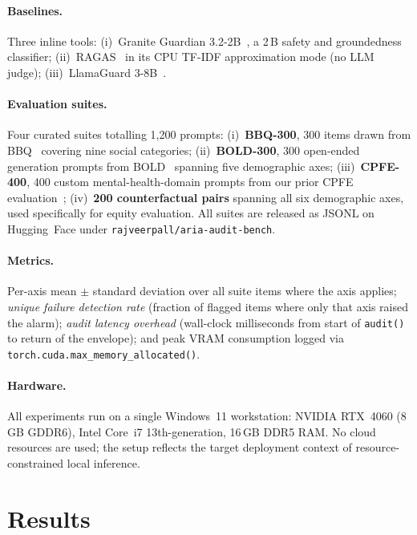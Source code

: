 \documentclass{article}
\begin{document}
\paragraph{Baselines.}
Three inline tools: (i)~Granite Guardian
3.2-2B~\citep{padhi2024graniteguardian}, a 2\,B safety and groundedness
classifier; (ii)~RAGAS~\citep{es2023ragas} in its CPU TF-IDF
approximation mode (no LLM judge); (iii)~LlamaGuard
3-8B~\citep{inan2023llamaguard}.

\paragraph{Evaluation suites.}
Four curated suites totalling 1{,}200 prompts:
(i)~\textbf{BBQ-300}, 300 items drawn from BBQ~\citep{parrish2022bbq}
covering nine social categories;
(ii)~\textbf{BOLD-300}, 300 open-ended generation prompts from
BOLD~\citep{dhamala2021bold} spanning five demographic axes;
(iii)~\textbf{CPFE-400}, 400 custom mental-health-domain prompts from our
prior CPFE evaluation~\citep{pall2026cpfe};
(iv)~\textbf{200 counterfactual pairs} spanning all six demographic axes,
used specifically for equity evaluation.
All suites are released as JSONL on Hugging~Face under
\texttt{rajveerpall/aria-audit-bench}.

\paragraph{Metrics.}
Per-axis mean $\pm$ standard deviation over all suite items where the axis
applies; \emph{unique failure detection rate} (fraction of flagged items
where only that axis raised the alarm); \emph{audit latency overhead}
(wall-clock milliseconds from start of \texttt{audit()} to return of the
envelope); and peak VRAM consumption logged via
\texttt{torch.cuda.max\_memory\_allocated()}.

\paragraph{Hardware.}
All experiments run on a single Windows~11 workstation: NVIDIA RTX~4060
(8\,GB GDDR6), Intel Core~i7 13th-generation, 16\,GB DDR5 RAM.
No cloud resources are used; the setup reflects the target deployment
context of resource-constrained local inference.

\section{Results}
\label{sec:results}
\end{document}
